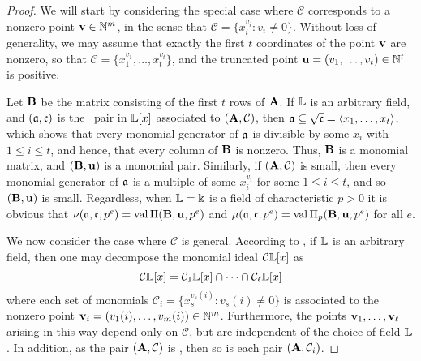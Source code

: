 \documentclass{amsart}
\begin{document}
\begin{proof}  
We will start by considering the special case where $\mathcal{C}$ corresponds to a nonzero point $\mathbf{v} \in \mathbb{N}^m$, in the sense that $\mathcal{C} = \{ x_i^{v_i} : v_i \neq 0 \}$. Without loss of generality, we may assume that exactly the first $t$ coordinates of the point $\mathbf{v}$ are nonzero, so that $\mathcal{C} = \{x_1^{v_1}, \ldots, x_t^{v_t}\}$, and the truncated point ${\mathbf{u}} = (v_1, \ldots, v_t) \in \mathbb{N}^t$ is positive.  

Let $\mathbf{B}$ be the matrix consisting of the first $t$ rows of $\mathbf{A}$.  If $\mathbb{L}$ is an arbitrary field, and $(\mathfrak{a}, \mathfrak{c})$ is the \compatible\ pair in $\mathbb{L}[x]$ associated to $(\mathbf{A}, \mathcal{C})$, then $\mathfrak{a} \subseteq \sqrt {\mathfrak{c}} = \langle x_1, \ldots, x_t \rangle$, which shows that every monomial generator of $\mathfrak{a}$ is divisible by some $x_i$ with $1 \leq i \leq t$, and hence, that every column of $\mathbf{B}$ is nonzero. Thus,  $\mathbf{B}$ is a monomial matrix, and $(\mathbf{B}, {\mathbf{u}})$ is a monomial pair.
Similarly, if $(\mathbf{A}, \mathcal{C})$ is small, then every monomial generator of $\mathfrak{a}$ is a multiple of some $x_i^{v_i}$ for some $1 \leq i \leq t$, and so $(\mathbf{B}, \mathbf{u})$ is small.  Regardless, when $\mathbb{L}=\Bbbk$ is a field of characteristic $p>0$ it is obvious that $\nu(\mathfrak{a}, \mathfrak{c}, p^e) = \operatorname{val} \Pi (\mathbf{B}, \mathbf{u}, p^e)$ and $\mu(\mathfrak{a}, \mathfrak{c}, p^e) = \operatorname{val} \Pi_p(\mathbf{B}, \mathbf{u}, p^e)$ for all $e$.

We now consider the case where $\mathcal{C}$ is general.   According to \cite[Lemma 5.18]{miller+sturmfels.combinatorial_CA},  if $\mathbb{L}$ is an arbitrary field, then one may decompose the monomial ideal $\mathcal{C} \mathbb{L}[x]$ as
%
\begin{equation}
\label{irreducible-decomposition: e}
 \mathcal{C} \mathbb{L}[x] = \mathcal{C}_1 \mathbb{L}[x] \cap \cdots \cap \mathcal{C}_{\ell} \mathbb{L}[x]
 \end{equation}
%
where each set of monomials $\mathcal{C}_i = \{ x_s^{v_s(i)} : v_s(i) \neq 0 \}$ is associated to the nonzero point $\mathbf{v}_i = (v_1(i), \ldots, v_m(i)) \in \mathbb{N}^m$. Furthermore, the points $\mathbf{v}_1, \ldots, \mathbf{v}_{\ell}$ arising in this way depend only on $\mathcal{C}$, but are independent of the choice of field $\mathbb{L}$.  In addition, as the pair $(\mathbf{A}, \mathcal{C})$ is \compatible, then so is each pair $(\mathbf{A}, \mathcal{C}_i)$.


\end{proof}
\end{document}
